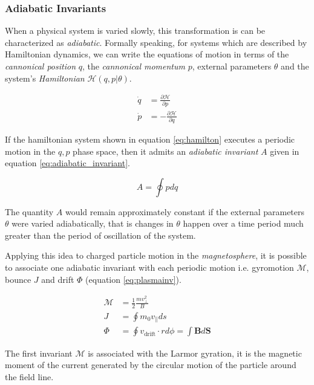 \subsubsection*{Adiabatic Invariants}

When a physical system is varied slowly, this transformation is can be characterized as \emph{adiabatic}. Formally speaking, 
for systems which are described by Hamiltonian dynamics, we can write the equations of motion in terms of 
the \emph{cannonical position} $q$, the \emph{cannonical momentum} $p$, external parameters $\theta$ and the system's 
\emph{Hamiltonian} $\mathcal{H}(q,p|\theta)$. 

\begin{align}\label{eq:hamilton}
    \dot q &= \frac{\partial \mathcal{H}}{\partial p}\\
    \dot p &= - \frac{\partial \mathcal{H}}{\partial q}
\end{align}

If the hamiltonian system shown in equation \ref{eq:hamilton} executes a periodic motion in the $q,p$ phase space, 
then it admits an \emph{adiabatic invariant} $A$ given in equation \ref{eq:adiabatic_invariant}.

\begin{equation}\label{eq:adiabatic_invariant}
    A = \oint p dq
\end{equation}

The quantity $A$ would remain approximately constant if the external parameters $\theta$ were varied adiabatically, 
that is changes in $\theta$ happen over a time period much greater than the period of oscillation of the system.

Applying this idea to charged particle motion in the \emph{magnetosphere}, it is possible to associate one 
adiabatic invariant with each periodic motion i.e. gyromotion $\mathcal{M}$, bounce $J$ and drift 
$\Phi$ (equation \ref{eq:plasmainv}). 

\begin{align}\label{eq:plasmainv}
    \mathcal{M} &= \frac{1}{2}\frac{mv^{2}_{\perp}}{B} \\
    J &= \oint{m_0 v_{\parallel}ds} \\
    \Phi &= \oint{v_{\text{drift}} \cdot r d\phi} = \int{\mathbf{B} d\mathbf{S}}
\end{align}


The first invariant $\mathcal{M}$ is associated with the Larmor gyration, it is the magnetic moment of the 
current generated by the circular motion of the particle around the field line. 

